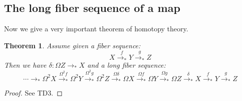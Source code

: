 \documentclass{article}
\newcommand{\sse}[1]{\medbreak \subsection{#1}}
\renewcommand{\r}{\rightarrow}
\newcommand{\refl}{\mathrm{refl}}
\newcommand{\id}{\mathrm{\bf id}}
\newcommand{\fib}{\mathrm{\bf fib}}
\newtheorem{proposition}{Proposition}
\newtheorem{theorem}{Theorem}
\newcommand{\comment}[1]{}
\begin{document}
\comment{
In order to understand this definition better, we make it explicit for sets. Note that next proposition is not an equivalence between types.

\begin{proposition}
A sequence of pointed sets:
\[X \overset{f}{\r_*} Y\overset{g}{\r_*} Z\] 
is a fiber sequence if and only if for all $y:Y$, we have:
\[\fib_f(y)\simeq (g(y)=*) \]
\end{proposition}
\begin{proof}
If $f,g$ form a fiber sequence, we can assume it is a canonical one. In this situation one need to show for $y:Y$ that:
\[\fib_{p_g}(y)\simeq(g(y)=*)\]
This is true by the Grothendieck correspondence.

For the converse assume: 
\[\epsilon : \big((x:X)\times (f(x)=y)\big)\r  (g(y)=*) \]
an equivalence. We want to show $f = p_g$. We build an equality directly. 
\begin{itemize}
\item We build a map $\psi$ from $X$ to $\fib_g$, defined by:
\[\psi(x) \, :\equiv\, (f(x),\epsilon(x,\refl_{f(x)}))\]
It is a pointed map, and we have $p_g\circ \psi =_{X\r_* Y} f$ (exercise: prove this).
\item We define $\phi$ the other way by:
\[\phi(y,p) \, :\equiv\, p_X(\epsilon^{-1}(p))\]
\item Now we check that $\phi(\psi(x)) =_X x$ indeed $\phi(\psi(x))$ is defined as:
\[p_X(\epsilon^{-1}\epsilon(x,\refl_{f(x)}))\]
which is equal to $x$.
\item In order to show $\psi\circ\phi \sim \id$, by induction it is enough to prove:
\[\psi(\phi(y,q)) = (y,q)\]
For $y:Y$ and $q:f(y)=*$. This means:
\[\phi(p_X(\epsilon^{-1}(q))) = (y,q)\]
Since $f(y)=*$ is a proposition, it is enough to prove:
\[f(p_X(\epsilon^{-1}(q))) = y\]
but this is the second component of $\epsilon^{-1}(q)$.
\end{itemize}
\end{proof}}


\sse{The long fiber sequence of a map}

Now we give a very important theorem of homotopy theory.

\begin{theorem}
Assume given a fiber sequence:
\[X \overset{f}{\r_*} Y\overset{g}{\r_*} Z\] 
Then we have $\delta : \Omega Z\r_* X$ and a long fiber sequence:
\[\cdots \r_* \Omega^2 X \overset{\Omega^2 f}{\r_*} \Omega^2 Y \overset{\Omega^2 g}{\r_*}\Omega^2 Z \overset{\Omega\delta}{\r_*} \Omega X \overset{\Omega f}{\r_*} \Omega Y \overset{\Omega g}{\r_*} \Omega Z \overset{\delta}{\r_*} X \overset{f}{\r_*} Y\overset{g}{\r_*} Z  \]
\end{theorem}
\begin{proof}
See TD3.
\end{proof}
\end{document}
